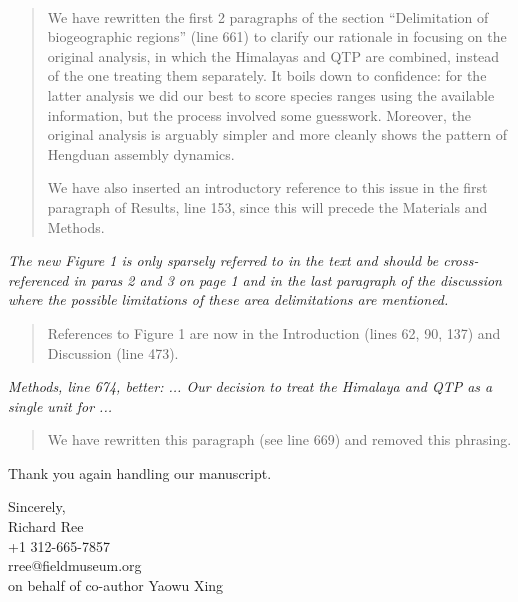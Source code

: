 \documentclass[11pt]{letter}
\begin{document}
\begin{letter}{ \\

}
\begin{quote}
  We have rewritten the first 2 paragraphs of the section
  ``Delimitation of biogeographic regions'' (line 661) to clarify our
  rationale in focusing on the original analysis, in which the
  Himalayas and QTP are combined, instead of the one treating them
  separately. It boils down to confidence: for the latter analysis we
  did our best to score species ranges using the available
  information, but the process involved some guesswork. Moreover, the
  original analysis is arguably simpler and more cleanly shows the
  pattern of Hengduan assembly dynamics.

  \vspace{6pt}

  We have also inserted an introductory reference to this issue in the
  first paragraph of Results, line 153, since this will precede the
  Materials and Methods.
\end{quote}

\textit{The new Figure 1 is only sparsely referred to in the text and
  should be cross-referenced in paras 2 and 3 on page 1 and in the
  last paragraph of the discussion where the possible limitations of
  these area delimitations are mentioned.}

\begin{quote}
  References to Figure 1 are now in the Introduction (lines 62, 90,
  137) and Discussion (line 473).
\end{quote}

\textit{Methods, line 674, better: ... Our decision to treat the
  Himalaya and QTP as a single unit for ...}

\begin{quote}
  We have rewritten this paragraph (see line 669) and removed this
  phrasing.
\end{quote}


Thank you again handling our manuscript.


\closing{Sincerely,\\
  \bigskip
  Richard Ree\\
  +1 312-665-7857\\
  rree@fieldmuseum.org\\
  \medskip on behalf of co-author Yaowu Xing
  }


\end{letter}
\end{document}
